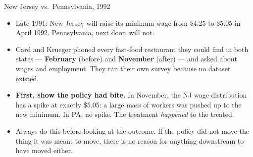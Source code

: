 \documentclass[
  11pt,
  ignorenonframetext,
  aspectratio=169,
]{beamer}
\providecommand{\tightlist}{%
  \setlength{\itemsep}{0pt}\setlength{\parskip}{0pt}}
\begin{document}
\begin{frame}{New Jersey vs.~Pennsylvania, 1992}
\protect{}\label{new-jersey-vs.-pennsylvania-1992}
\begin{itemize}
\tightlist
\item
  Late 1991: New Jersey will raise its minimum wage from \$4.25 to
  \$5.05 in April 1992. Pennsylvania, next door, will not.
\item
  Card and Krueger phoned every fast-food restaurant they could find in
  both states --- \textbf{February} (before) and \textbf{November}
  (after) --- and asked about wages and employment. They ran their own
  survey because no dataset existed.
\end{itemize}

\vspace{0.3em}

\begin{itemize}
\tightlist
\item
  \textbf{First, show the policy had bite.} In November, the NJ wage
  distribution has a spike at exactly \$5.05: a large mass of workers
  was pushed up to the new minimum. In PA, no spike. The treatment
  \emph{happened} to the treated.
\item
  Always do this before looking at the outcome. If the policy did not
  move the thing it was meant to move, there is no reason for anything
  downstream to have moved either.
\end{itemize}
\end{frame}
\end{document}
